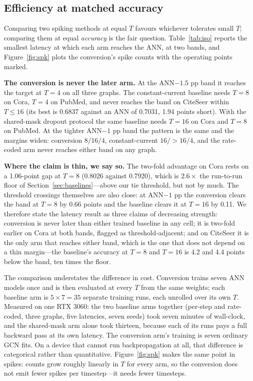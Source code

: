 \documentclass[10pt,twocolumn]{article}
\newcommand{\figref}[1]{Figure~\ref{#1}}
\newcommand{\tabref}[1]{Table~\ref{#1}}
\newcommand{\secref}[1]{Section~\ref{#1}}
\begin{document}
\subsection{Efficiency at matched accuracy}
\label{sec:iso}

Comparing two spiking methods at equal $T$ favours whichever tolerates small $T$; comparing them at
equal \emph{accuracy} is the fair question. \tabref{tab:iso} reports the smallest latency at which
each arm reaches the ANN, at two bands, and \figref{fig:spk} plots the conversion's spike counts
with the operating points marked.

\textbf{The conversion is never the later arm.} At the ANN$-1.5$ pp band it reaches the target at
$T=4$ on all three graphs. The constant-current baseline needs $T=8$ on Cora, $T=4$ on PubMed, and
never reaches the band on CiteSeer within $T \le 16$ (its best is 0.6837 against an ANN of 0.7031,
1.94 points short). With the shared-mask dropout protocol the same baseline needs $T=16$ on Cora and
$T=8$ on PubMed. At the tighter ANN$-1$ pp band the pattern is the same and the margins widen:
conversion $8/16/4$, constant-current $16/>16/4$, and the rate-coded arm never reaches either band
on any graph.

\textbf{Where the claim is thin, we say so.} The two-fold advantage on Cora rests on a 1.06-point gap
at $T=8$ (0.8026 against 0.7920), which is $2.6\times$ the run-to-run floor of
\secref{sec:baselines}---above our tie threshold, but not by much. The threshold crossings
themselves are also close: at ANN$-1$ pp the conversion clears the band at $T=8$ by 0.66 points and
the baseline clears it at $T=16$ by 0.11. We therefore state the latency result as three claims of
decreasing strength: conversion is never later than either trained baseline in any cell; it is
two-fold earlier on Cora at both bands, flagged as threshold-adjacent; and on CiteSeer it is the only
arm that reaches either band, which is the one that does not depend on a thin margin---the baseline's
accuracy at $T=8$ and $T=16$ is 4.2 and 4.4 points below the band, ten times the floor.

The comparison understates the difference in cost. Conversion trains seven ANN models once and is
then evaluated at every $T$ from the same weights; each baseline arm is $5 \times 7 = 35$ separate
training runs, each unrolled over its own $T$. Measured on one RTX 3060: the two baseline arms
together (per-step and rate-coded, three graphs, five latencies, seven seeds) took seven minutes of
wall-clock, and the shared-mask arm alone took thirteen, because each of its runs pays a full
backward pass at its own latency. The conversion arm's training is seven ordinary GCN fits. On a
device that cannot run backpropagation at all, that difference is categorical rather than
quantitative. \figref{fig:spk} makes the same point in spikes:
counts grow roughly linearly in $T$ for every arm, so the conversion does not emit fewer spikes per
timestep---it needs fewer timesteps.
\end{document}
